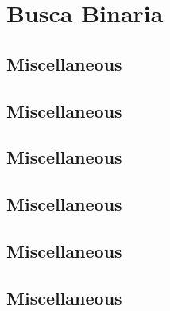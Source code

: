 \section{Busca Binaria}
\subsection{Miscellaneous}
\raggedbottom
\vspace{-.7\baselineskip}\hrulefill
\vspace{0.1\baselineskip}\subsection{Miscellaneous}
\raggedbottom
\vspace{-.7\baselineskip}\hrulefill
\vspace{0.1\baselineskip}\subsection{Miscellaneous}
\raggedbottom
\vspace{-.7\baselineskip}\hrulefill
\vspace{0.1\baselineskip}\subsection{Miscellaneous}
\raggedbottom
\vspace{-.7\baselineskip}\hrulefill
\vspace{0.1\baselineskip}\subsection{Miscellaneous}
\raggedbottom
\vspace{-.7\baselineskip}\hrulefill
\vspace{0.1\baselineskip}\subsection{Miscellaneous}
\raggedbottom
\vspace{-.7\baselineskip}\hrulefill

